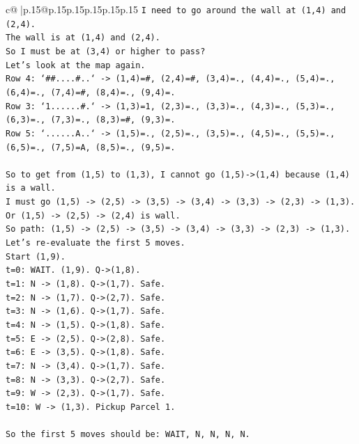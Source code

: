 \documentclass{article}
\begin{document}
{\begin{supertabular}{c@{$\;$}|p{.15\linewidth}@{}p{.15\linewidth}p{.15\linewidth}p{.15\linewidth}p{.15\linewidth}p{.15\linewidth}}
{{{\texttt{I need to go around the wall at (1,4) and (2,4).} \\
\texttt{The wall is at (1,4) and (2,4).} \\
\texttt{So I must be at (3,4) or higher to pass?} \\
\texttt{Let's look at the map again.} \\
\texttt{Row 4: `\#\#....\#..` {-}> (1,4)=\#, (2,4)=\#, (3,4)=., (4,4)=., (5,4)=., (6,4)=., (7,4)=\#, (8,4)=., (9,4)=.} \\
\texttt{Row 3: `1......\#.` {-}> (1,3)=1, (2,3)=., (3,3)=., (4,3)=., (5,3)=., (6,3)=., (7,3)=., (8,3)=\#, (9,3)=.} \\
\texttt{Row 5: `......A..` {-}> (1,5)=., (2,5)=., (3,5)=., (4,5)=., (5,5)=., (6,5)=., (7,5)=A, (8,5)=., (9,5)=.} \\
\\ 
\texttt{So to get from (1,5) to (1,3), I cannot go (1,5){-}>(1,4) because (1,4) is a wall.} \\
\texttt{I must go (1,5) {-}> (2,5) {-}> (3,5) {-}> (3,4) {-}> (3,3) {-}> (2,3) {-}> (1,3).} \\
\texttt{Or (1,5) {-}> (2,5) {-}> (2,4) is wall.} \\
\texttt{So path: (1,5) {-}> (2,5) {-}> (3,5) {-}> (3,4) {-}> (3,3) {-}> (2,3) {-}> (1,3).} \\
\texttt{Let's re{-}evaluate the first 5 moves.} \\
\texttt{Start (1,9).} \\
\texttt{t=0: WAIT. (1,9). Q{-}>(1,8).} \\
\texttt{t=1: N {-}> (1,8). Q{-}>(1,7). Safe.} \\
\texttt{t=2: N {-}> (1,7). Q{-}>(2,7). Safe.} \\
\texttt{t=3: N {-}> (1,6). Q{-}>(1,7). Safe.} \\
\texttt{t=4: N {-}> (1,5). Q{-}>(1,8). Safe.} \\
\texttt{t=5: E {-}> (2,5). Q{-}>(2,8). Safe.} \\
\texttt{t=6: E {-}> (3,5). Q{-}>(1,8). Safe.} \\
\texttt{t=7: N {-}> (3,4). Q{-}>(1,7). Safe.} \\
\texttt{t=8: N {-}> (3,3). Q{-}>(2,7). Safe.} \\
\texttt{t=9: W {-}> (2,3). Q{-}>(1,7). Safe.} \\
\texttt{t=10: W {-}> (1,3). Pickup Parcel 1.} \\
\\ 
\texttt{So the first 5 moves should be: WAIT, N, N, N, N.} \\
}}}
\end{supertabular}}
\end{document}
